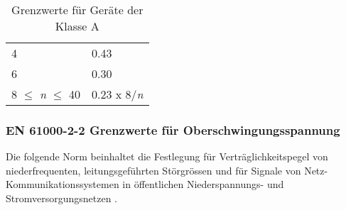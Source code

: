 \begin{table}[ht!]
\begin{tabular}{|l|l|}
		4                                            & 0.43                                                                                                                \\
		6                                            & 0.30                                                                                                                \\
		8 $\leq$ \textit{n} $\leq$ 40                & 0.23 x 8/\textit{n}                                                                                                 \\ \hline
	\end{tabular}
\caption{Grenzwerte für Geräte der Klasse A}\label{tab:Grenzwerte_Normen}
\end{table}





\subsubsection{EN 61000-2-2 Grenzwerte für Oberschwingungsspannung}\label{sec:Spannungsnormen}

Die folgende Norm beinhaltet die Festlegung für Verträglichkeitspegel von niederfrequenten, leitungsgeführten Störgrössen und für Signale von Netz-Kommunikationssystemen in öffentlichen Niederspannungs- und Stromversorgungsnetzen \cite{SpannungsNorm}. 


